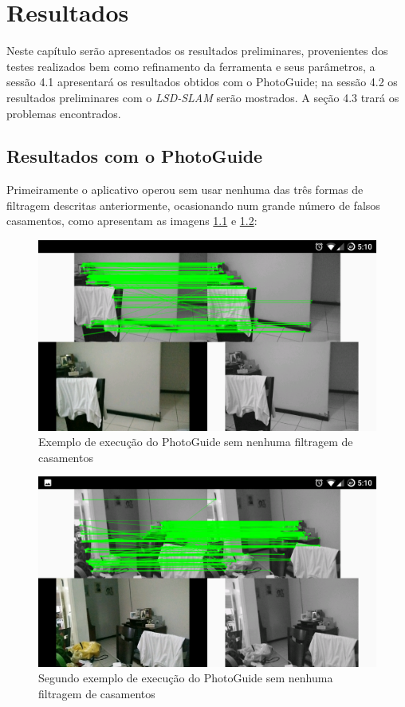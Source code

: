 \chapter{Resultados}

Neste capítulo serão apresentados os resultados preliminares, provenientes dos testes realizados bem como refinamento da ferramenta e seus parâmetros, a sessão 4.1 apresentará os resultados obtidos com o PhotoGuide; na sessão 4.2 os resultados preliminares com o \textit{LSD-SLAM} serão mostrados. A seção 4.3 trará os problemas encontrados.

\section{Resultados com o PhotoGuide}

Primeiramente o aplicativo operou sem usar nenhuma das três formas de filtragem descritas anteriormente, ocasionando num grande número de falsos casamentos, como apresentam as imagens \ref{fig4:1} e \ref{fig4:2}:

\begin{figure}[!htb]
	\centering
		\includegraphics[width= \textwidth]{Imagens/figura4-1.png}
	\caption{Exemplo de execução do PhotoGuide sem nenhuma filtragem de casamentos}
	\label{fig4:1}
\end{figure}

\begin{figure}[!htb]
	\centering
		\includegraphics[width= \textwidth]{Imagens/figura4-2.png}
	\caption{Segundo exemplo de execução do PhotoGuide sem nenhuma filtragem de casamentos}
	\label{fig4:2}
\end{figure}

